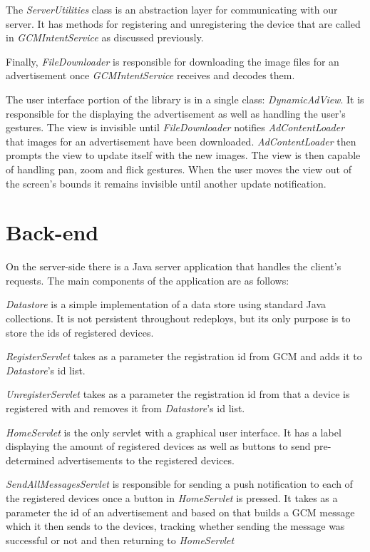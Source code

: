 The \textit{ServerUtilities} class is an abstraction layer for communicating with our server. It has methods for registering and unregistering the device that are called in \textit{GCMIntentService} as discussed previously.

Finally, \textit{FileDownloader} is responsible for downloading the image files for an advertisement once \textit{GCMIntentService} receives and decodes them.

The user interface portion of the library is in a single class: \textit{DynamicAdView}. It is responsible for the displaying the advertisement as well as handling the user's gestures. The view is invisible until \textit{FileDownloader} notifies \textit{AdContentLoader} that images for an advertisement have been downloaded. \textit{AdContentLoader} then prompts the view to update itself with the new images. The view is then capable of handling pan, zoom and flick gestures. When the user moves the view out of the screen's bounds it remains invisible until another update notification.

\section{Back-end}

On the server-side there is a Java server application that handles the client's requests. The main components of the application are as follows:

\textit{Datastore} is a simple implementation of a data store using standard Java collections. It is not persistent throughout redeploys, but its only purpose is to store the ids of registered devices.

\textit{RegisterServlet} takes as a parameter the registration id from GCM and adds it to \textit{Datastore}'s id list.

\textit{UnregisterServlet} takes as a parameter the registration id from that a device is registered with and removes it from \textit{Datastore}'s id list.

\textit{HomeServlet} is the only servlet with a graphical user interface. It has a label displaying the amount of registered devices as well as buttons to send pre-determined advertisements to the registered devices.

\textit{SendAllMessagesServlet} is responsible for sending a push notification to each of the registered devices once a button in \textit{HomeServlet} is pressed. It takes as a parameter the id of an advertisement and based on that builds a GCM message which it then sends to the devices, tracking whether sending the message was successful or not and then returning to \textit{HomeServlet}

